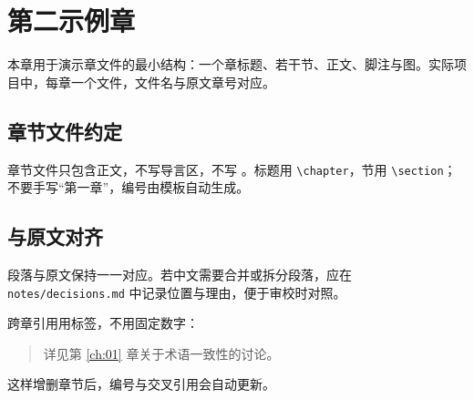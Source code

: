 \chapter{第二示例章}
\label{ch:02}

本章用于演示章文件的最小结构：一个章标题、若干节、正文、脚注与图。实际项目中，每章一个文件，文件名与原文章号对应。

\section{章节文件约定}

章节文件只包含正文，不写导言区，不写 \verb||。标题用 \verb|\chapter|，节用 \verb|\section|；不要手写“第一章”，编号由模板自动生成。

\section{与原文对齐}

段落与原文保持一一对应。若中文需要合并或拆分段落，应在 \texttt{notes/decisions.md} 中记录位置与理由，便于审校时对照。

跨章引用用标签，不用固定数字：

\begin{quote}
详见第 \ref{ch:01} 章关于术语一致性的讨论。
\end{quote}

这样增删章节后，编号与交叉引用会自动更新。
